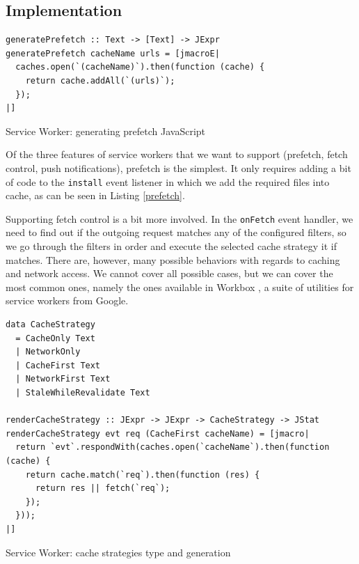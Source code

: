 \documentclass[english,zadani,odsaz]{fitthesis}
\begin{document}
\subsection{Implementation}
\label{sec:org4bb90b6}
\begin{listing}[t]
\begin{verbatim}
generatePrefetch :: Text -> [Text] -> JExpr
generatePrefetch cacheName urls = [jmacroE|
  caches.open(`(cacheName)`).then(function (cache) {
    return cache.addAll(`(urls)`);
  });
|]
\end{verbatim}
\caption{Service Worker: generating prefetch JavaScript \label{prefetch}}
\end{listing}

Of the three features of service workers that we want to support (prefetch,
fetch control, push notifications), prefetch is the simplest. It only requires
adding a bit of code to the \texttt{install} event listener in which we add the required
files into cache, as can be seen in Listing \ref{prefetch}.

Supporting fetch control is a bit more involved. In the \texttt{onFetch} event handler,
we need to find out if the outgoing request matches any of the configured
filters, so we go through the filters in order and execute the selected cache
strategy it if matches. There are, however, many possible behaviors with regards
to caching and network access. We cannot cover all possible cases, but we can
cover the most common ones, namely the ones available in Workbox \cite{workbox}, a
suite of utilities for service workers from Google.

\begin{listing}[!b]
\begin{verbatim}
data CacheStrategy
  = CacheOnly Text
  | NetworkOnly
  | CacheFirst Text
  | NetworkFirst Text
  | StaleWhileRevalidate Text

renderCacheStrategy :: JExpr -> JExpr -> CacheStrategy -> JStat
renderCacheStrategy evt req (CacheFirst cacheName) = [jmacro|
  return `evt`.respondWith(caches.open(`cacheName`).then(function (cache) {
    return cache.match(`req`).then(function (res) {
      return res || fetch(`req`);
    });
  }));
|]
\end{verbatim}
\caption{Service Worker: cache strategies type and generation \label{cache-strategy}}
\end{listing}
\end{document}
